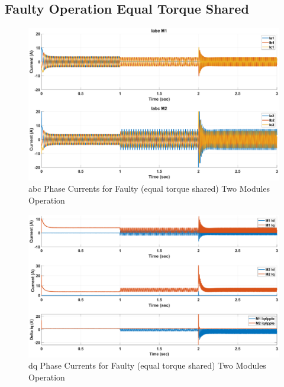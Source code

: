 \documentclass{article}
\begin{document}
\subsection{Faulty Operation Equal Torque Shared}

\begin{figure}[h!]
\centering
\includegraphics[scale=0.35]{SimulationResults/two_modules/faulty_torqueshared/Iabc.eps}
\caption{abc Phase Currents for Faulty (equal torque shared) Two Modules Operation}
\label{fig:PhaseCurrentsAbcTwoModulesFaultyEqualTorque}
\end{figure}

\begin{figure}[h!]
\centering
\includegraphics[scale=0.35]{SimulationResults/two_modules/faulty_torqueshared/Idq_iqripple.eps}
\caption{dq Phase Currents for Faulty (equal torque shared) Two Modules Operation}
\label{fig:PhaseCurrentsDqTwoModulesFaultyEqualTorque}
\end{figure}
\end{document}
